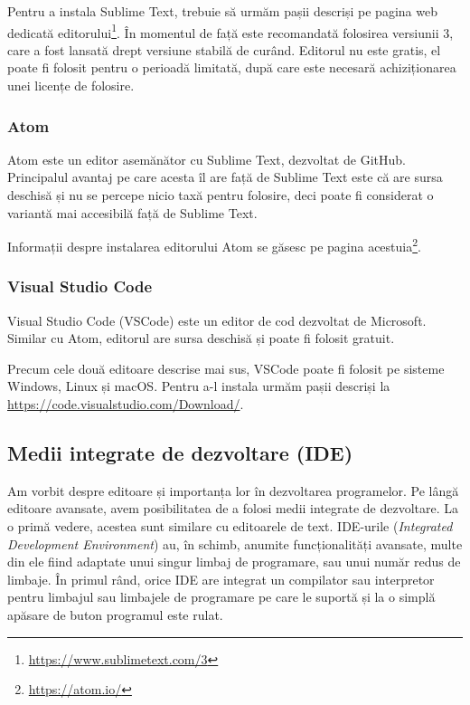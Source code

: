 Pentru a instala Sublime Text, trebuie să urmăm pașii descriși pe pagina web dedicată editorului\footnote{\url{https://www.sublimetext.com/3}}.
În momentul de față este recomandată folosirea versiunii 3, care a fost lansată drept versiune stabilă de curând.
Editorul nu este gratis, el poate fi folosit pentru o perioadă limitată, după care este necesară achiziționarea unei licențe de folosire.

\subsubsection{Atom}
\label{sec:appdev:dev:editor-gui:atom}

Atom este un editor asemănător cu Sublime Text, dezvoltat de GitHub.
Principalul avantaj pe care acesta îl are față de Sublime Text este că are sursa deschisă și nu se percepe nicio taxă pentru folosire, deci poate fi considerat o variantă mai accesibilă față de Sublime Text.

Informații despre instalarea editorului Atom se găsesc pe pagina acestuia\footnote{\url{https://atom.io/}}.

\subsubsection{Visual Studio Code}
\label{sec:appdev:dev:editor-gui:vscode}

Visual Studio Code (VSCode) este un editor de cod dezvoltat de Microsoft.
Similar cu Atom, editorul are sursa deschisă și poate fi folosit gratuit.

Precum cele două editoare descrise mai sus, VSCode poate fi folosit pe sisteme Windows, Linux și macOS.
Pentru a-l instala urmăm pașii descriși la \url{https://code.visualstudio.com/Download/}.

\subsection{Medii integrate de dezvoltare (IDE)}
\label{sec:appdev:dev:ide}

Am vorbit despre editoare și importanța lor în dezvoltarea programelor.
Pe lângă editoare avansate, avem posibilitatea de a folosi medii integrate de dezvoltare.
La o primă vedere, acestea sunt similare cu editoarele de text.
IDE-urile  (\textit{Integrated Development Environment}) au, în schimb, anumite funcționalități avansate, multe din ele fiind adaptate unui singur limbaj de programare, sau unui număr redus de limbaje.
În primul rând, orice IDE are integrat un compilator sau interpretor pentru limbajul sau limbajele de programare pe care le suportă și la o simplă apăsare de buton programul este rulat.

